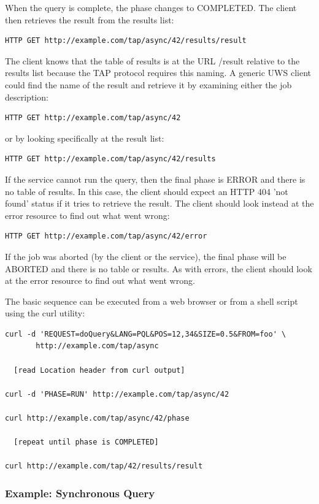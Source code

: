 \documentclass[11pt,letter]{ivoa}
\begin{document}
{When the query is complete, the phase changes to COMPLETED. The client then 
retrieves the result from the results list:
\begin{verbatim}
HTTP GET http://example.com/tap/async/42/results/result
\end{verbatim}
The client knows that the table of results is at the URL /result relative to the 
results list because the TAP protocol requires this naming. A generic UWS client 
could find the name of the result and retrieve it by examining either the job 
description:
\begin{verbatim}
HTTP GET http://example.com/tap/async/42
\end{verbatim}
or by looking specifically at the result list:
\begin{verbatim}
HTTP GET http://example.com/tap/async/42/results
\end{verbatim}
If the service cannot run the query, then the final phase is ERROR and there is 
no table of results. In this case, the client should expect an HTTP 404 'not 
found' status if it tries to retrieve the result. The client should look instead 
at the error resource to find out what went wrong:
\begin{verbatim}
HTTP GET http://example.com/tap/async/42/error
\end{verbatim}
If the job was aborted (by the client or the service), the final phase will be 
ABORTED and there is no table or results. As with errors, the client should look 
at the error resource to find out what went wrong.

The basic sequence can be executed from a web browser or from a shell script 
using the curl utility:
\begin{verbatim}
curl -d 'REQUEST=doQuery&LANG=PQL&POS=12,34&SIZE=0.5&FROM=foo' \
       http://example.com/tap/async

  [read Location header from curl output]

curl -d 'PHASE=RUN' http://example.com/tap/async/42

curl http://example.com/tap/async/42/phase

  [repeat until phase is COMPLETED]

curl http://example.com/tap/42/results/result
\end{verbatim}

\subsubsection{Example: Synchronous Query}

}
\end{document}
